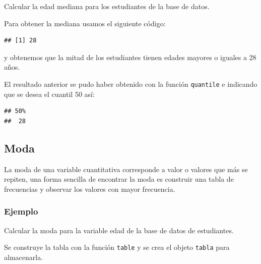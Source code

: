 \documentclass[10pt,]{krantz}
\makeatletter
\newenvironment{Shaded}{\begin{snugshade}}{\end{snugshade}}
\newcommand{\KeywordTok}[1]{\textcolor[rgb]{0.13,0.29,0.53}{\textbf{#1}}}
\newcommand{\DataTypeTok}[1]{\textcolor[rgb]{0.13,0.29,0.53}{#1}}
\newcommand{\FloatTok}[1]{\textcolor[rgb]{0.00,0.00,0.81}{#1}}
\newcommand{\OperatorTok}[1]{\textcolor[rgb]{0.81,0.36,0.00}{\textbf{#1}}}
\newcommand{\NormalTok}[1]{#1}
\newenvironment{kframe}{%
\medskip{}
\setlength{\fboxsep}{.8em}
 \def\at@end@of@kframe{}%
 \ifinner\ifhmode%
  \def\at@end@of@kframe{\end{minipage}}%
  \begin{minipage}{\columnwidth}%
 \fi\fi%
 \def\FrameCommand##1{\hskip\@totalleftmargin \hskip-\fboxsep
 \colorbox{shadecolor}{##1}\hskip-\fboxsep
     \hskip-\linewidth \hskip-\@totalleftmargin \hskip\columnwidth}%
 \MakeFramed {\advance\hsize-\width
   \@totalleftmargin\z@ \linewidth\hsize
   \@setminipage}}%
 {\par\unskip\endMakeFramed%
 \at@end@of@kframe}
\renewenvironment{Shaded}{\begin{kframe}}{\end{kframe}}
\makeatother
\begin{document}
Calcular la edad mediana para los estudiantes de la base de datos.

Para obtener la mediana usamos el siguiente código:

\begin{Shaded}
\end{Shaded}

\begin{verbatim}
## [1] 28
\end{verbatim}

y obtenemos que la mitad de los estudiantes tienen edades mayores o
iguales a 28 años.

El resultado anterior se pudo haber obtenido con la función
\texttt{quantile} e indicando que se desea el cuantil 50 así:

\begin{Shaded}
\end{Shaded}

\begin{verbatim}
## 50% 
##  28
\end{verbatim}

\subsection{\texorpdfstring{Moda }{Moda }}\label{moda}

La moda de una variable cuantitativa corresponde a valor o valores que
más se repiten, una forma sencilla de encontrar la moda es construir una
tabla de frecuencias y observar los valores con mayor frecuencia.

\subsubsection*{Ejemplo}\label{ejemplo-19}

Calcular la moda para la variable edad de la base de datos de
estudiantes.

Se construye la tabla con la función \texttt{table} y se crea el objeto
\texttt{tabla} para almacenarla.
\end{document}
